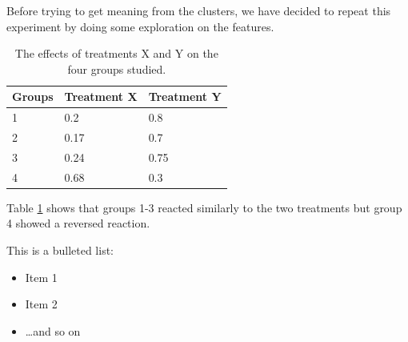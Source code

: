 \documentclass[idxtotoc,hyperref,openany]{labbook} %
\begin{document}
Before trying to get meaning from the clusters, we have decided to repeat this experiment by doing some exploration on the features.




\begin{table}[H]
\begin{tabular}{l l l}
\toprule
\textbf{Groups} & \textbf{Treatment X} & \textbf{Treatment Y} \\
\toprule
1 & 0.2 & 0.8\\
2 & 0.17 & 0.7\\
3 & 0.24 & 0.75\\
4 & 0.68 & 0.3\\
\bottomrule
\end{tabular}
\caption{The effects of treatments X and Y on the four groups studied.}
\label{tab:treatments_xy}
\end{table}

Table \ref{tab:treatments_xy} shows that groups 1-3 reacted similarly to the two treatments but group 4 showed a reversed reaction.




This is a bulleted list:

\begin{itemize}
\item Item 1
\item Item 2
\item \ldots and so on
\end{itemize}



\lipsum[6]



\lipsum[7]

\end{document}
